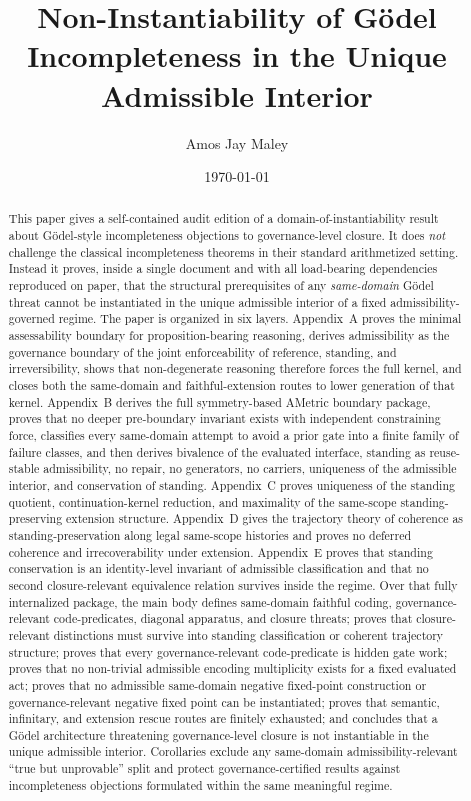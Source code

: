 \documentclass[11pt]{article}
\title{Non-Instantiability of G\"odel Incompleteness in the Unique Admissible Interior\\
}
\author{Amos Jay Maley}
\date{\today}
\theoremstyle{plain}
\theoremstyle{definition}
\begin{document}
\maketitle

\begin{abstract}
This paper gives a self-contained audit edition of a domain-of-instantiability result about G\"odel-style incompleteness objections to governance-level closure. It does \emph{not} challenge the classical incompleteness theorems in their standard arithmetized setting. Instead it proves, inside a single document and with all load-bearing dependencies reproduced on paper, that the structural prerequisites of any \emph{same-domain} G\"odel threat cannot be instantiated in the unique admissible interior of a fixed admissibility-governed regime. The paper is organized in six layers. Appendix~A proves the minimal assessability boundary for proposition-bearing reasoning, derives admissibility as the governance boundary of the joint enforceability of reference, standing, and irreversibility, shows that non-degenerate reasoning therefore forces the full kernel, and closes both the same-domain and faithful-extension routes to lower generation of that kernel. Appendix~B derives the full symmetry-based AMetric boundary package, proves that no deeper pre-boundary invariant exists with independent constraining force, classifies every same-domain attempt to avoid a prior gate into a finite family of failure classes, and then derives bivalence of the evaluated interface, standing as reuse-stable admissibility, no repair, no generators, no carriers, uniqueness of the admissible interior, and conservation of standing. Appendix~C proves uniqueness of the standing quotient, continuation-kernel reduction, and maximality of the same-scope standing-preserving extension structure. Appendix~D gives the trajectory theory of coherence as standing-preservation along legal same-scope histories and proves no deferred coherence and irrecoverability under extension. Appendix~E proves that standing conservation is an identity-level invariant of admissible classification and that no second closure-relevant equivalence relation survives inside the regime. Over that fully internalized package, the main body defines same-domain faithful coding, governance-relevant code-predicates, diagonal apparatus, and closure threats; proves that closure-relevant distinctions must survive into standing classification or coherent trajectory structure; proves that every governance-relevant code-predicate is hidden gate work; proves that no non-trivial admissible encoding multiplicity exists for a fixed evaluated act; proves that no admissible same-domain negative fixed-point construction or governance-relevant negative fixed point can be instantiated; proves that semantic, infinitary, and extension rescue routes are finitely exhausted; and concludes that a G\"odel architecture threatening governance-level closure is not instantiable in the unique admissible interior. Corollaries exclude any same-domain admissibility-relevant ``true but unprovable'' split and protect governance-certified results against incompleteness objections formulated within the same meaningful regime.
\end{abstract}
\end{document}
